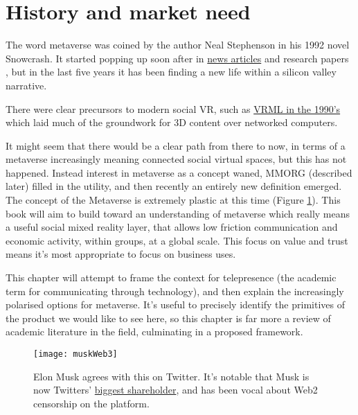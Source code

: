 
\section{History and market need}

The word metaverse was coined by the author Neal Stephenson in his 1992 novel Snowcrash. It started popping up soon after in \href{https://www.newscientist.com/article/mg14819994-000-how-to-build-a-metaverse/}{news articles} and research papers \cite{mclellan1993avatars}, but in the last five years it has been finding a new life within a silicon valley narrative.\par
There were clear precursors to modern social VR, such as \href{https://www.howtogeek.com/778554/remembering-vrml-the-metaverse-of-1995/}{VRML in the 1990's} which laid much of the groundwork for 3D content over networked computers.\par%
It might seem that there would be a clear path from there to now, in terms of a metaverse increasingly meaning connected social virtual spaces, but this has not happened. Instead interest in metaverse as a concept waned, MMORG (described later) filled in the utility, and then recently an entirely new definition emerged. The concept of the Metaverse is extremely plastic at this time (Figure \ref{fig:muskWeb3}). This book will aim to build toward an understanding of metaverse which really means a useful social mixed reality layer, that allows low friction communication and economic activity, within groups, at a global scale. This focus on value and trust means it's most appropriate to focus on business uses.\par
This chapter will attempt to frame the context for telepresence (the academic term for communicating through technology), and then explain the increasingly polarised options for metaverse. It's useful to precisely identify the primitives of the product we would like to see here, so this chapter is far more a review of academic literature in the field, culminating in a proposed framework.\par
\begin{figure}
  \centering
    \texttt{[image: muskWeb3]}
  \caption{Elon Musk agrees with this on Twitter. It's notable that Musk is now Twitters' \href{https://twitter.com/paraga/status/1511320953598357505}{biggest shareholder}, and has been vocal about Web2 censorship on the platform.}
  \label{fig:muskWeb3}
\end{figure}
    
